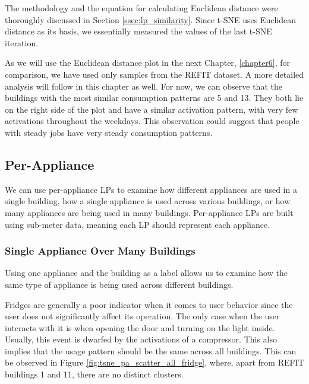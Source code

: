The methodology and the equation for calculating Euclidean distance were thoroughly discussed in Section \ref{ssec:lp_similarity}.
Since t-SNE uses Euclidean distance as its basis, we essentially measured the values of the last t-SNE iteration.

As we will use the Euclidean distance plot in the next Chapter, \ref{chapter6}, for comparison, we have used only samples from the REFIT dataset.
A more detailed analysis will follow in this chapter as well.
For now, we can observe that the buildings with the most similar consumption patterns are 5 and 13.
They both lie on the right side of the plot and have a similar activation pattern, with very few activations throughout the weekdays.
This observation could suggest that people with steady jobs have very steady consumption patterns.

\subsection{Per-Appliance}

We can use per-appliance LPs to examine how different appliances are used in a single building, how a single appliance is used across various buildings, or how many appliances are being used in many buildings.
Per-appliance LPs are built using sub-meter data, meaning each LP should represent each appliance.

\subsubsection{Single Appliance Over Many Buildings}

Using one appliance and the building as a label allows us to examine how the same type of appliance is being used across different buildings.

Fridges are generally a poor indicator when it comes to user behavior since the user does not significantly affect its operation.
The only case when the user interacts with it is when opening the door and turning on the light inside.
Usually, this event is dwarfed by the activations of a compressor.
This also implies that the usage pattern should be the same across all buildings.
This can be observed in Figure \ref{fig:tsne_pa_scatter_all_fridge}, where, apart from REFIT buildings 1 and 11, there are no distinct clusters.

